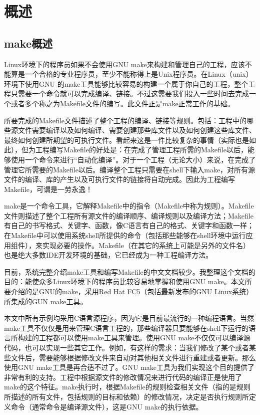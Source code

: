 ﻿\chapter{概述}

\section{make概述}

Linux环境下的程序员如果不会使用GNU make来构建和管理自己的工程，应该不能算是一个合格的专业程序员，至少不能称得上是Unix程序员。在Linux（unix）环境下使用GNU 的make工具能够比较容易的构建一个属于你自己的工程，整个工程只需要一个命令就可以完成编译、链接。不过这需要我们投入一些时间去完成一个或者多个称之为Makefile文件的编写。此文件正是make正常工作的基础。

所要完成的Makefile文件描述了整个工程的编译、链接等规则。包括：工程中的哪些源文件需要编译以及如何编译、需要创建那些库文件以及如何创建这些库文件、最终如何创建所期望的可执行文件。看起来这是一件比较复杂的事情（实际也是如此），但为工程编写Makefile的好处是：在完成了管理工程所需的Makefile以后，能够使用一个命令来进行“自动化编译”。对于一个工程（无论大小）来说，在完成了管理它所需要的Makefile以后。编译整个工程只需要在shell下输入make，对所有源文件的编译、库的产生以及可执行文件的链接将自动完成。因此为工程编写Makefile，可谓是一劳永逸！

make是一个命令工具，它解释Makefile中的指令（Makefile中称为规则）。Makefile文件则描述了整个工程所有源文件的编译顺序、编译规则以及编译方法；Makefile有自己的书写格式、关键字、函数，像C语言有自己的格式、关键字和函数一样；在Makefile中可以使用系统shell所提供的命令（包括那些能够在shell环境中运行应用组件），来实现必要的操作。Makefile（在其它的系统上可能是另外的文件名）也是绝大多数IDE开发环境的基础，它已经成为一种工程编译方法。

目前，系统完整介绍make工具和编写Makefile的中文文档较少。我整理这个文档的目的：能使众多Linux环境下的程序员比较容易地掌握和使用GNU make。本文所要介绍的是GNU的make，采用Red Hat FC5（包括最新发布的GNU Linux系统）所集成的GUN make工具。

本文中所有示例均采用C语言源程序，因为它是目前最流行的一种编程语言。当然make工具不仅仅是用来管理C语言工程的，那些编译器只要能够在shell下运行的语言所构建的工程都可以使用make工具来管理。使用GNU make不仅仅可以编译源代码，也可以实现一些其它工作。例如，有这样的需求：当我们修改了某个或者某些文件后，需要能够根据修改文件来自动对其他相关文件进行重建或者更新。那么使用GNU make工具是再合适不过了。GNU make工具为我们实现这个目的提供了非常有利的支持。工程中根据源文件的修改情况来进行代码的编译正是使用了make的这个特征。make执行时，根据Makefile的规则检查相关文件（指的是规则所描述的所有文件，包括规则的目标和依赖）的修改情况，决定是否执行规则所定义命令（通常命令是编译源文件），这是GNU make的执行依据。

